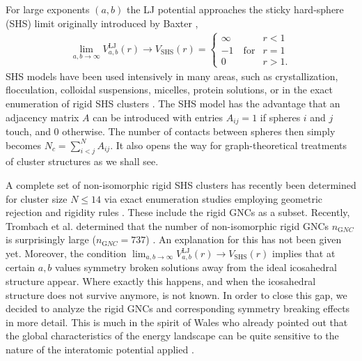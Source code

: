 For large exponents $(a,b)$ the LJ potential approaches the sticky hard-sphere
(SHS) limit originally introduced by Baxter \autocite{baxter68,Gazzillo_AnalyticsolutionsBaxter_2004},
\begin{align}
    \lim_{a,b\rightarrow \infty} V_{a,b}^\mathrm{LJ}(r) \rightarrow V_\mathrm{SHS}(r)=
    \begin{cases}
        \infty   & r < 1\\
        -1  \quad \mathrm{for} & r = 1\\
        0       & r > 1.
    \end{cases}
\label{eqn:KS1}
\end{align}
SHS models have been used intensively in many areas, such as crystallization,
flocculation, colloidal suspensions, micelles, protein solutions, or in the
exact enumeration of rigid SHS clusters
\autocite{Stell_Stickyspheresrelated_1991,Jamnik_Spatialcorrelationssolvation_1996,Santos_Radialdistributionfunctions_1998,Gazzillo_AnalyticsolutionsBaxter_2004,Hoy_MinimalEnergyPackings_2010,Arkus_Minimalenergyclusters_2009,Arkus-2010,Arkus_DerivingFiniteSphere_2011,Hoy_Structurefinitesphere_2012,Hayes_ScienceStickySpheres_2012,Holmes-Cerfon_geometricalapproachcomputing_2013,Holmes-Cerfon_EnumeratingRigidSphere_2016,Holmes-Cerfon_StickySphereClusters_2017,Kallus_Freeenergysingular_2017}.
The SHS model has the advantage that an adjacency matrix $A$ can be introduced
with entries $A_{ij}=1$ if spheres $i$ and $j$ touch, and 0 otherwise. The
number of contacts between spheres then simply becomes $N_c=\sum_{i<j}^N
A_{ij}$. It also opens the way for graph-theoretical treatments of cluster
structures as we shall see.

A complete set of non-isomorphic rigid SHS clusters has recently been
determined for cluster size $N \leq 14$ via exact enumeration studies employing
geometric rejection
\autocite{Hoy_Structuredynamicsmodel_2015,Holmes-Cerfon_EnumeratingRigidSphere_2016}
and rigidity rules \autocite{Holmes-Cerfon_StickySphereClusters_2017}. These
include the rigid \acp{GNC} as a subset. Recently, Trombach et al. determined
that the number of non-isomorphic rigid \acp{GNC} $n_{\mathrm GNC}$ is
surprisingly large ($n_{\mathrm GNC}=737$) \autocite{Trombach_stickyhardsphereLennardJonestypeclusters_2018}. An explanation for
this has not been given yet. Moreover, the condition $\lim_{a,b\rightarrow
\infty} V_{a,b}^\mathrm{LJ}(r) \rightarrow V_\mathrm{SHS}(r)$ implies that at
certain $a,b$ values symmetry broken solutions away from the ideal icosahedral
structure appear. Where exactly this happens, and when the icosahedral
structure does not survive anymore, is not known. In order to close this gap,
we decided to analyze the rigid \acp{GNC} and corresponding symmetry breaking
effects in more detail. This is much in the spirit of Wales who already pointed
out that the global characteristics of the energy landscape can be quite
sensitive to the nature of the interatomic potential applied
\autocite{Wales_MicroscopicBasisGlobal_2001}.



